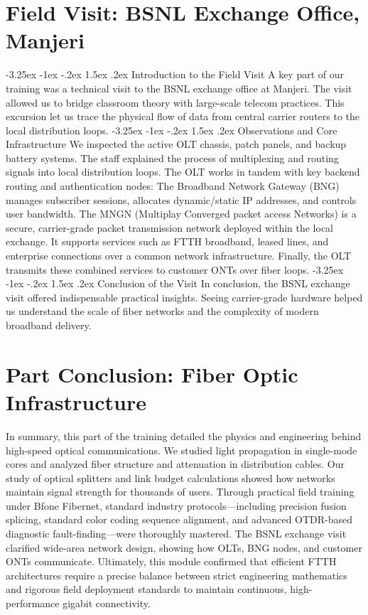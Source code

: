 \documentclass[11pt,a4paper]{report}
\makeatletter
\renewcommand{\section}{\@startsection{section}{1}{\z@}%
  {-3.25ex \@plus -1ex \@minus -.2ex}%
  {1.5ex \@plus.2ex}%
  {\normalfont\Large\bfseries\color{primaryColor}}}
\makeatother
\begin{document}
\chapter{Field Visit: BSNL Exchange Office, Manjeri}
\section{Introduction to the Field Visit}
A key part of our training was a technical visit to the BSNL exchange office at Manjeri. The visit allowed us to bridge classroom theory with large-scale telecom practices. This excursion let us trace the physical flow of data from central carrier routers to the local distribution loops.
\section{Observations and Core Infrastructure}
We inspected the active OLT chassis, patch panels, and backup battery systems. The staff explained the process of multiplexing and routing signals into local distribution loops. The OLT works in tandem with key backend routing and authentication nodes: The Broadband Network Gateway (BNG) manages subscriber sessions, allocates dynamic/static IP addresses, and controls user bandwidth. The MNGN (Multiplay Converged packet access Networks) is a secure, carrier-grade packet transmission network deployed within the local exchange. It supports services such as FTTH broadband, leased lines, and enterprise connections over a common network infrastructure. Finally, the OLT transmits these combined services to customer ONTs over fiber loops.
\section{Conclusion of the Visit}
In conclusion, the BSNL exchange visit offered indispensable practical insights. Seeing carrier-grade hardware helped us understand the scale of fiber networks and the complexity of modern broadband delivery.
\chapter*{Part Conclusion: Fiber Optic Infrastructure}
In summary, this part of the training detailed the physics and engineering behind high-speed optical communications. We studied light propagation in single-mode cores and analyzed fiber structure and attenuation in distribution cables. Our study of optical splitters and link budget calculations showed how networks maintain signal strength for thousands of users. Through practical field training under Bfone Fibernet, standard industry protocols—including precision fusion splicing, standard color coding sequence alignment, and advanced OTDR-based diagnostic fault-finding—were thoroughly mastered. The BSNL exchange visit clarified wide-area network design, showing how OLTs, BNG nodes, and customer ONTs communicate. Ultimately, this module confirmed that efficient FTTH architectures require a precise balance between strict engineering mathematics and rigorous field deployment standards to maintain continuous, high-performance gigabit connectivity.
\end{document}
